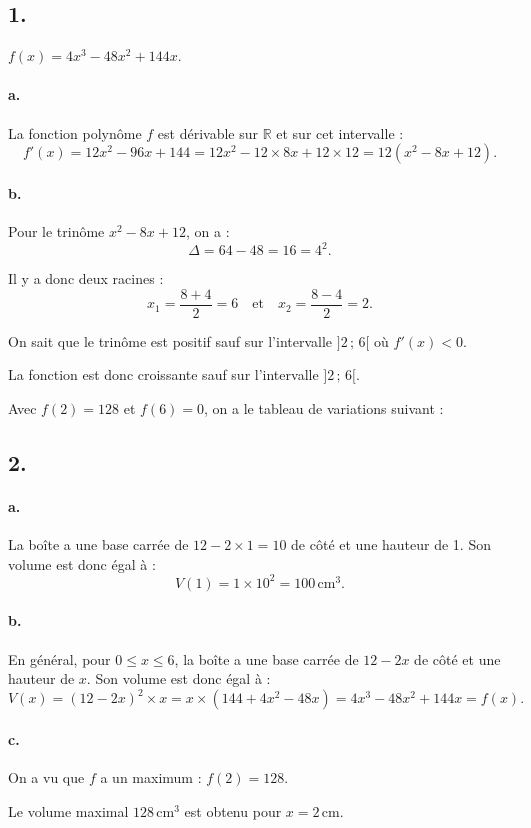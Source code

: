 \subsection*{1.}

\(f(x) = 4x^3 - 48x^2 + 144x\).

\paragraph{a.} La fonction polynôme \( f \) est dérivable sur \( \mathbb{R} \) et sur cet intervalle :
\[
f'(x) = 12x^2 - 96x + 144 = 12x^2 - 12 \times 8x + 12 \times 12 = 12(x^2 - 8x + 12).
\]

\paragraph{b.} Pour le trinôme \( x^2 - 8x + 12 \), on a :
\[
\Delta = 64 - 48 = 16 = 4^2.
\]

Il y a donc deux racines :
\[
x_1 = \dfrac{8 + 4}{2} = 6 \quad \text{et} \quad x_2 = \dfrac{8 - 4}{2} = 2.
\]

On sait que le trinôme est positif sauf sur l'intervalle \( ]2\,;\,6[ \) où \( f'(x) < 0 \).

La fonction est donc croissante sauf sur l'intervalle \( ]2\,;\,6[ \).

Avec \( f(2) = 128 \) et \( f(6) = 0 \), on a le tableau de variations suivant :
\begin{center}
\end{center}

\subsection*{2.}

\paragraph{a.} La boîte a une base carrée de \( 12 - 2 \times 1 = 10 \) de côté et une hauteur de 1. Son volume est donc égal à :
\[
V(1) = 1 \times 10^2 = 100 \, \text{cm}^3.
\]

\paragraph{b.} En général, pour \( 0 \leqslant x \leqslant 6 \), la boîte a une base carrée de \( 12 - 2x \) de côté et une hauteur de \( x \). Son volume est donc égal à :
\[
V(x) = (12 - 2x)^2 \times x = x \times (144 + 4x^2 - 48x) = 4x^3 - 48x^2 + 144x = f(x).
\]

\paragraph{c.} On a vu que \( f \) a un maximum : \( f(2) = 128 \).

Le volume maximal \( 128 \, \text{cm}^3 \) est obtenu pour \( x = 2 \, \text{cm} \).
